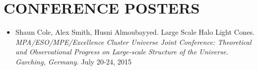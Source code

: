 \section{CONFERENCE POSTERS}
\begin{itemize}

\item Shaun Cole, Alex Smith, Husni Almoubayyed. Large Scale Halo Light Cones. {\sl MPA/ESO/MPE/Excellence Cluster Universe Joint Conference: Theoretical and Observational Progress on Large-scale Structure of the Universe. Garching, Germany.} \hfill  July 20-24, 2015
\end{itemize}